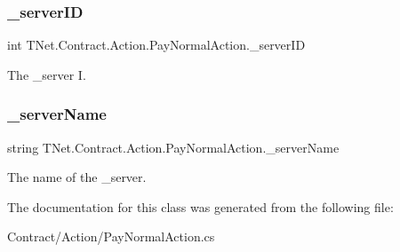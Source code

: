 \subsubsection{\texorpdfstring{\+\_\+server\+ID}{\_serverID}}
{\footnotesize\ttfamily int T\+Net.\+Contract.\+Action.\+Pay\+Normal\+Action.\+\_\+server\+ID\hspace{0.3cm}{\ttfamily [protected]}}



The \+\_\+server I. 

\mbox{\label{class_t_net_1_1_contract_1_1_action_1_1_pay_normal_action_ad60a98eb4f4b95d9788fe37178b50686}} 
\subsubsection{\texorpdfstring{\+\_\+server\+Name}{\_serverName}}
{\footnotesize\ttfamily string T\+Net.\+Contract.\+Action.\+Pay\+Normal\+Action.\+\_\+server\+Name\hspace{0.3cm}{\ttfamily [protected]}}



The name of the \+\_\+server. 



The documentation for this class was generated from the following file\+:\begin{DoxyCompactItemize}
\item 
Contract/\+Action/Pay\+Normal\+Action.\+cs\end{DoxyCompactItemize}
